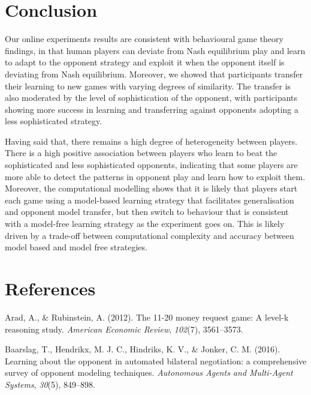 \documentclass[man,floatsintext]{apa6}
\begin{document}
\hypertarget{conclusion}{%
\section{Conclusion}\label{conclusion}}

Our online experiments results are consistent with behavioural game theory findings, in that human players can deviate from Nash equilibrium play and learn to adapt to the opponent strategy and exploit it when the opponent itself is deviating from Nash equilibrium. Moreover, we showed that participants transfer their learning to new games with varying degrees of similarity. The transfer is also moderated by the level of sophistication of the opponent, with participants showing more success in learning and transferring against opponents adopting a less sophisticated strategy.

Having said that, there remains a high degree of heterogeneity between players. There is a high positive association between players who learn to beat the sophisticated and less sophisticated opponents, indicating that some players are more able to detect the patterns in opponent play and learn how to exploit them. Moreover, the computational modelling shows that it is likely that players start each game using a model-based learning strategy that facilitates generalisation and opponent model transfer, but then switch to behaviour that is consistent with a model-free learning strategy as the experiment goes on. This is likely driven by a trade-off between computational complexity and accuracy between model based and model free strategies.
\newpage

\hypertarget{references}{%
\section{References}\label{references}}

\begingroup
\setlength{\parindent}{-0.5in}
\setlength{\leftskip}{0.5in}

\hypertarget{refs}{}
\leavevmode\hypertarget{ref-arad201211}{}%
Arad, A., \& Rubinstein, A. (2012). The 11-20 money request game: A level-k reasoning study. \emph{American Economic Review}, \emph{102}(7), 3561--3573.

\leavevmode\hypertarget{ref-baarslag2016learning}{}%
Baarslag, T., Hendrikx, M. J. C., Hindriks, K. V., \& Jonker, C. M. (2016). Learning about the opponent in automated bilateral negotiation: a comprehensive survey of opponent modeling techniques. \emph{Autonomous Agents and Multi-Agent Systems}, \emph{30}(5), 849--898.
\end{document}
